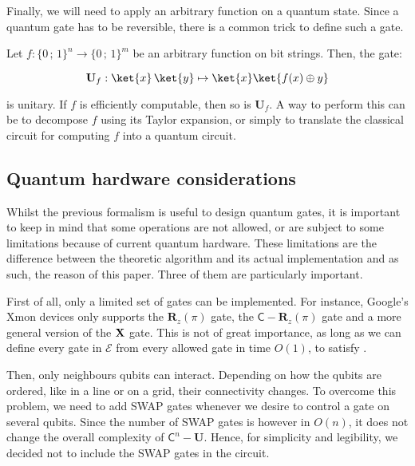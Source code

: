 \documentclass[11pt, a4paper]{article}
\begin{document}
                
                Finally, we will need to apply an arbitrary function on a quantum state. Since a quantum gate has to be reversible, there is a common trick to define such a gate.
                
                \begin{definition}
                    Let \(f:\{0\,;\,1\}^n\to\{0\,;\,1\}^m\) be an arbitrary function on bit strings. Then, the gate:
                    
                    \[\mathbf{U}_f:\ket{x}\,\ket{y}\mapsto\ket{x}\ket{f(x)\oplus y}\]
                    
                    is unitary. If \(f\) is efficiently computable, then so is \(\mathbf{U}_f\). A way to perform this can be to decompose \(f\) using its Taylor expansion, or simply to translate the classical circuit for computing \(f\) into a quantum circuit.
                \end{definition}

        \subsection{Quantum hardware considerations}
            \label{subsec:Hardware}
            Whilst the previous formalism is useful to design quantum gates, it is important to keep in mind that some operations are not allowed, or are subject to some limitations because of current quantum hardware. These limitations are the difference between the theoretic algorithm and its actual implementation and as such, the reason of this paper. Three of them are particularly important.
            
            First of all, only a limited set of gates can be implemented. For instance, Google’s Xmon devices only supports the \(\mathbf{R}_z(\pi)\) gate, the \(\mathsf{C}-\mathbf{R}_z(\pi)\) gate and a more general version of the \(\mathbf{X}\) gate. This is not of great importance, as long as we can define every gate in \(\mathcal{E}\) from every allowed gate in time \(O(1)\), to satisfy .
            
            Then, only neighbours qubits can interact. Depending on how the qubits are ordered, like in a line or on a grid, their connectivity changes. To overcome this problem, we need to add SWAP gates whenever we desire to control a gate on several qubits. Since the number of SWAP gates is however in \(O(n)\), it does not change the overall complexity of \(\mathsf{C}^n-\mathbf{U}\). Hence, for simplicity and legibility, we decided not to include the SWAP gates in the circuit.
            
\end{document}
